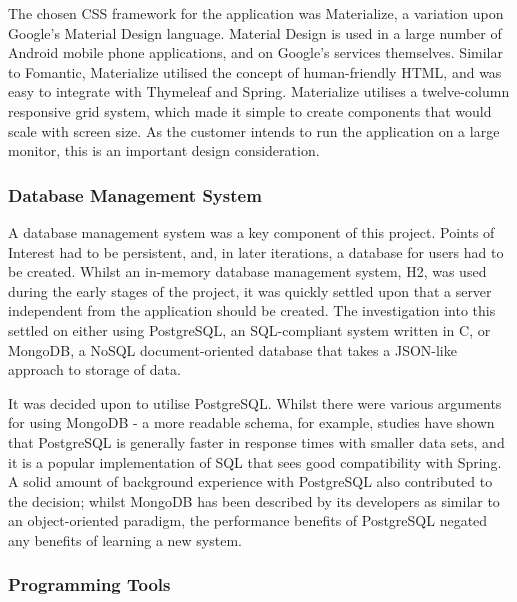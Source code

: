 The chosen CSS framework for the application was Materialize, a variation upon Google's Material Design language. Material Design is used in a large number of Android mobile phone applications, and on Google's services themselves. Similar to Fomantic, Materialize utilised the concept of human-friendly HTML, and was easy to integrate with Thymeleaf and Spring. Materialize utilises a twelve-column responsive grid system, which made it simple to create components that would scale with screen size. As the customer intends to run the application on a large monitor, this is an important design consideration\cite{Materialize}.

\subsubsection{Database Management System}

A database management system was a key component of this project. Points of Interest had to be persistent, and, in later iterations, a database for users had to be created. Whilst an in-memory database management system, H2, was used during the early stages of the project, it was quickly settled upon that a server independent from the application should be created. The investigation into this settled on either using PostgreSQL, an SQL-compliant system written in C, or MongoDB, a NoSQL document-oriented database that takes a JSON-like approach to storage of data.

It was decided upon to utilise PostgreSQL. Whilst there were various arguments for using MongoDB - a more readable schema, for example, studies have shown that PostgreSQL is generally faster in response times with smaller data sets, and it is a popular implementation of SQL that sees good compatibility with Spring\cite{cheng_zhou_wang_2019}. A solid amount of background experience with PostgreSQL also contributed to the decision; whilst MongoDB has been described by its developers as similar to an object-oriented paradigm, the performance benefits of PostgreSQL negated any benefits of learning a new system.


\subsubsection{Programming Tools}

